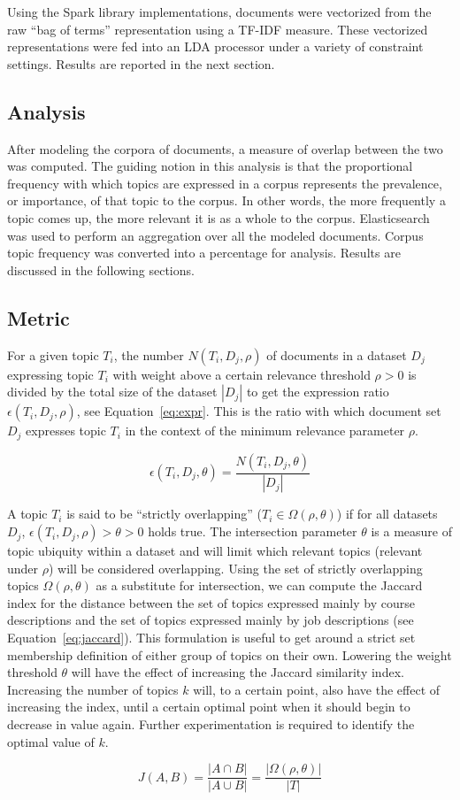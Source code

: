 Using the Spark library implementations, documents were vectorized from the raw ``bag of terms'' representation using a TF-IDF measure.
These vectorized representations were fed into an LDA processor under a variety of constraint settings.
Results are reported in the next section.

\subsection{Analysis}

After modeling the corpora of documents, a measure of overlap between the two was computed.
The guiding notion in this analysis is that the proportional frequency with which topics are expressed in a corpus represents the prevalence, or importance, of that topic to the corpus.
In other words, the more frequently a topic comes up, the more relevant it is as a whole to the corpus.
Elasticsearch was used to perform an aggregation over all the modeled documents.
Corpus topic frequency was converted into a percentage for analysis.
Results are discussed in the following sections.

\subsection{Metric}

For a given topic $T_i$, the number $N(T_i, D_j, \rho)$ of documents in a dataset $D_j$ expressing topic $T_i$ with weight above a certain relevance threshold $\rho > 0$ is divided by the total size of the dataset $|D_j|$ to get the expression ratio $\epsilon(T_i, D_j, \rho)$, see Equation~\ref{eq:expr}.
This is the ratio with which document set $D_j$ expresses topic $T_i$ in the context of the minimum relevance parameter $\rho$.

\begin{equation}
  \epsilon(T_i, D_j, \theta) = \frac{N(T_i, D_j, \theta)}{|D_j|}
  \label{eq:expr}
\end{equation}

A topic $T_i$ is said to be ``strictly overlapping'' ($T_i \in \Omega(\rho, \theta)$) if for all datasets $D_j$, $\epsilon(T_i, D_j, \rho) > \theta > 0$ holds true.
The intersection parameter $\theta$ is a measure of topic ubiquity within a dataset and will limit which relevant topics (relevant under $\rho$) will be considered overlapping.
Using the set of strictly overlapping topics $\Omega(\rho, \theta)$ as a substitute for intersection, we can compute the Jaccard index for the distance between the set of topics expressed mainly by course descriptions and the set of topics expressed mainly by job descriptions (see Equation~\ref{eq:jaccard}).
This formulation is useful to get around a strict set membership definition of either group of topics on their own.
Lowering the weight threshold $\theta$ will have the effect of increasing the Jaccard similarity index.
Increasing the number of topics $k$ will, to a certain point, also have the effect of increasing the index, until a certain optimal point when it should begin to decrease in value again.
Further experimentation is required to identify the optimal value of $k$.

\begin{equation}
  J(A, B) = \frac{|A \cap B|}{|A \cup B|} = \frac{|\Omega(\rho, \theta)|}{|T|}
  \label{eq:jaccard}
\end{equation}

